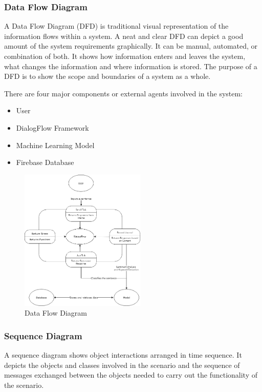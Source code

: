 \documentclass[conference,compsoc]{IEEEtran}
\begin{document}
\subsubsection{Data Flow Diagram}

A Data Flow Diagram (DFD) is traditional visual representation of the information flows within a system. A neat and clear DFD can depict a good amount of the system requirements graphically. It can be manual, automated, or combination of both. It shows how information enters and leaves the system, what changes the information and where information is stored. The purpose of a DFD is to show the scope and boundaries of a system as a whole.

There are four major components or external agents involved in the system:
\begin{itemize}
    \item User
    \item DialogFlow Framework
    \item Machine Learning Model
    \item Firebase Database
\end{itemize}

\begin{figure}[H]
    \centering
    \includegraphics[width=6cm]{images/data-flow-diagram.png}
    \caption{Data Flow Diagram}
\end{figure}

\subsubsection{Sequence Diagram}

A sequence diagram shows object interactions arranged in time sequence. It depicts the objects and classes involved in the scenario and the sequence of messages exchanged between the objects needed to carry out the functionality of the scenario.
\end{document}
